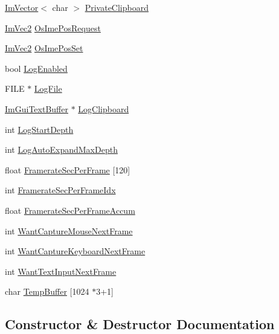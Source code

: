 \begin{DoxyCompactItemize}
\hyperlink{class_im_vector}{Im\+Vector}$<$ char $>$ \hyperlink{struct_im_gui_context_a4ba950183c7c5e401ca4113e09b1ced4}{Private\+Clipboard}
\item 
\hyperlink{struct_im_vec2}{Im\+Vec2} \hyperlink{struct_im_gui_context_af98a8f8b9c96bf8b692449daedf45602}{Os\+Ime\+Pos\+Request}
\item 
\hyperlink{struct_im_vec2}{Im\+Vec2} \hyperlink{struct_im_gui_context_a466a0975ad72e7e3deaea6bcfb6b446d}{Os\+Ime\+Pos\+Set}
\item 
bool \hyperlink{struct_im_gui_context_a2508bec1862aa4477eca2c79d6924b82}{Log\+Enabled}
\item 
F\+I\+LE $\ast$ \hyperlink{struct_im_gui_context_a73a73a599720fb933e4fb5e673dde131}{Log\+File}
\item 
\hyperlink{struct_im_gui_text_buffer}{Im\+Gui\+Text\+Buffer} $\ast$ \hyperlink{struct_im_gui_context_a676007461d3ce20e50a092573dc05064}{Log\+Clipboard}
\item 
int \hyperlink{struct_im_gui_context_a6ac157821b3a0eb9d0411bc477df8665}{Log\+Start\+Depth}
\item 
int \hyperlink{struct_im_gui_context_a153d8c6eee2acdd3676ca55aec7b1079}{Log\+Auto\+Expand\+Max\+Depth}
\item 
float \hyperlink{struct_im_gui_context_aca772ab262c0094e8bbe7eae215fc23b}{Framerate\+Sec\+Per\+Frame} \mbox{[}120\mbox{]}
\item 
int \hyperlink{struct_im_gui_context_a64a96ad72dd7009dba134f6214a4936e}{Framerate\+Sec\+Per\+Frame\+Idx}
\item 
float \hyperlink{struct_im_gui_context_abcd18f2f8fedf0f45c3148b3e956e653}{Framerate\+Sec\+Per\+Frame\+Accum}
\item 
int \hyperlink{struct_im_gui_context_a7e7a9bbeaac9519abe29818ce6c2cc3b}{Want\+Capture\+Mouse\+Next\+Frame}
\item 
int \hyperlink{struct_im_gui_context_a0372056c72eac8b3e6de06c404caa5b3}{Want\+Capture\+Keyboard\+Next\+Frame}
\item 
int \hyperlink{struct_im_gui_context_abe551d35ea5c1aa61a4d5c785c8e0d9d}{Want\+Text\+Input\+Next\+Frame}
\item 
char \hyperlink{struct_im_gui_context_a875033fc5c10bc1e050f8701055ae93b}{Temp\+Buffer} \mbox{[}1024 $\ast$3+1\mbox{]}
\end{DoxyCompactItemize}


\subsection{Constructor \& Destructor Documentation}
\hypertarget{struct_im_gui_context_a28776600467e31fcc353a8aedec727f1}{}\label{struct_im_gui_context_a28776600467e31fcc353a8aedec727f1} 
